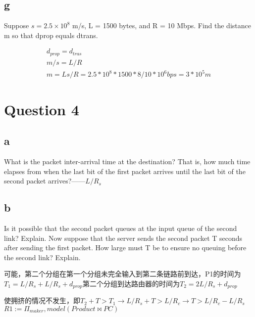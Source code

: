 \documentclass[UTF8]{article}
\begin{document}
\subsection*{g}
Suppose $s = 2.5\times 10^8$ m/s, L = 1500 bytes, and R = 10 Mbps. Find the distance m so that dprop equals dtrans.\par
\begin{gather}
    d_{prop} = d_{tras} \\
    m/s = L/R \\
    m = Ls/R = 2.5*10^{8}*1500*8/10*10^6bps = 3*10^5m
\end{gather}
\section*{Question 4}
\subsection*{a}
What is the packet inter-arrival time at the destination? That is, how much time elapses from when the last bit of the first packet arrives until the last bit of the second packet arrives?——$L/R_s$
\subsection*{b}
Is it possible that the second packet queues at the input queue of the second link? Explain. Now suppose that the server sends the second packet T seconds after sending the first packet. How large must T be to ensure no queuing before the second link? Explain.\par
可能，第二个分组在第一个分组未完全输入到第二条链路前到达，P1的时间为$T_1=L/R_s+L/R_s+d_{prop}$第二个分组到达路由器的时间为$T_2=2L/R_s+d_{prop}$ \par
使拥挤的情况不发生，即$T_2+T > T_1 \rightarrow L/R_s+T>L/R_c \rightarrow T > L/R_c-L/R_s$
$R1 := \Pi_{maker}, model(Product \bowtie PC) $
\end{document}

